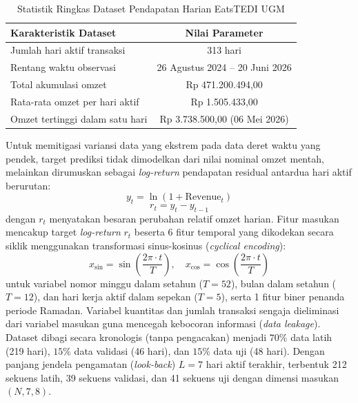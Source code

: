 \documentclass[10pt,a4paper]{article}
\begin{document}
\begin{table}[H]
  \centering
  \caption{Statistik Ringkas Dataset Pendapatan Harian EatsTEDI UGM}
  \label{tab:statistik_data}
  \fontsize{9pt}{11pt}\selectfont
  \begin{tabular}{lc}
    \toprule
    \textbf{Karakteristik Dataset} & \textbf{Nilai Parameter} \\
    \midrule
    Jumlah hari aktif transaksi & 313 hari \\
    Rentang waktu observasi & 26 Agustus 2024 -- 20 Juni 2026 \\
    Total akumulasi omzet & Rp 471.200.494,00 \\
    Rata-rata omzet per hari aktif & Rp 1.505.433,00 \\
    Omzet tertinggi dalam satu hari & Rp 3.738.500,00 (06 Mei 2026) \\
    \bottomrule
  \end{tabular}
\end{table}

Untuk memitigasi variansi data yang ekstrem pada data deret waktu yang pendek, target prediksi tidak dimodelkan dari nilai nominal omzet mentah, melainkan dirumuskan sebagai \textit{log-return} pendapatan residual antardua hari aktif berurutan:
\begin{equation}
  y_t = \ln(1 + \text{Revenue}_t)
  \label{eq:log_revenue}
\end{equation}
\begin{equation}
  r_t = y_t - y_{t-1}
  \label{eq:log_return}
\end{equation}
dengan $r_t$ menyatakan besaran perubahan relatif omzet harian. Fitur masukan mencakup target \textit{log-return} $r_t$ beserta 6 fitur temporal yang dikodekan secara siklik menggunakan transformasi sinus-kosinus (\textit{cyclical encoding}):
\begin{equation}
  x_{\sin} = \sin\left(\frac{2\pi \cdot t}{T}\right), \quad x_{\cos} = \cos\left(\frac{2\pi \cdot t}{T}\right)
  \label{eq:cyclical}
\end{equation}
untuk variabel nomor minggu dalam setahun ($T=52$), bulan dalam setahun ($T=12$), dan hari kerja aktif dalam sepekan ($T=5$), serta 1 fitur biner penanda periode Ramadan. Variabel kuantitas dan jumlah transaksi sengaja dieliminasi dari variabel masukan guna mencegah kebocoran informasi (\textit{data leakage}). Dataset dibagi secara kronologis (tanpa pengacakan) menjadi $70\%$ data latih (219 hari), $15\%$ data validasi (46 hari), dan $15\%$ data uji (48 hari). Dengan panjang jendela pengamatan (\textit{look-back}) $L=7$ hari aktif terakhir, terbentuk 212 sekuens latih, 39 sekuens validasi, dan 41 sekuens uji dengan dimensi masukan $(N, 7, 8)$.
\end{document}
